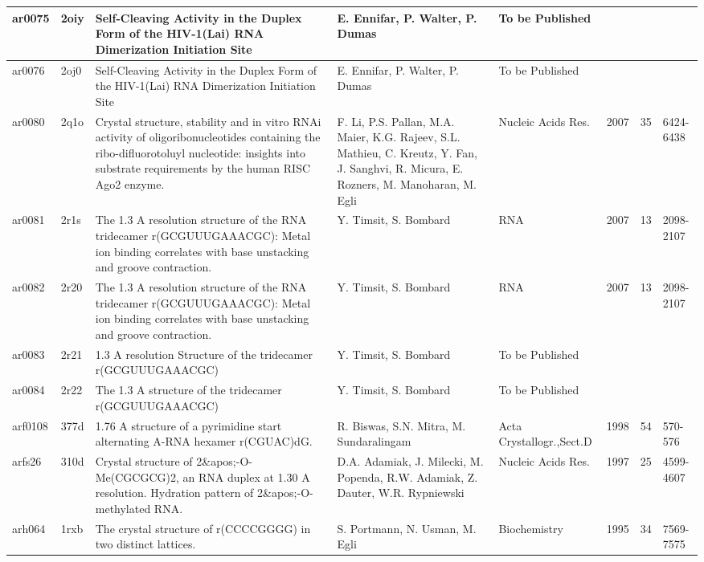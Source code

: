 {\begin{landscape}
\begin{center}
\begin{longtable}{p{0.76cm}   p{0.74cm}  p{5.2cm}   p{5.2cm}  p{3.2cm}
    p{0.6cm} p{0.9cm} p{1.8cm}}
ar0075 & 2oiy & Self-Cleaving Activity in the Duplex Form of the HIV-1(Lai) RNA Dimerization Initiation Site & E. Ennifar, P. Walter, P. Dumas & To be Published & \multicolumn{1}{l}{} & \multicolumn{1}{l}{} &   \\ \hline
ar0076 & 2oj0 & Self-Cleaving Activity in the Duplex Form of the HIV-1(Lai) RNA Dimerization Initiation Site & E. Ennifar, P. Walter, P. Dumas & To be Published & \multicolumn{1}{l}{} & \multicolumn{1}{l}{} &   \\ \hline
ar0080 & 2q1o & Crystal structure, stability and in vitro RNAi activity of oligoribonucleotides containing the ribo-difluorotoluyl nucleotide: insights into substrate requirements by the human RISC Ago2 enzyme. & F. Li, P.S. Pallan, M.A. Maier, K.G. Rajeev, S.L. Mathieu, C. Kreutz, Y. Fan, J. Sanghvi, R. Micura, E. Rozners, M. Manoharan, M. Egli & Nucleic Acids Res. & 2007 & 35 & 6424-6438 \\ \hline
ar0081 & 2r1s & The 1.3 A resolution structure of the RNA tridecamer r(GCGUUUGAAACGC): Metal ion binding correlates with base unstacking and groove contraction. & Y. Timsit, S. Bombard & RNA & 2007 & 13 & 2098-2107 \\ \hline
ar0082 & 2r20 & The 1.3 A resolution structure of the RNA tridecamer r(GCGUUUGAAACGC): Metal ion binding correlates with base unstacking and groove contraction. & Y. Timsit, S. Bombard & RNA & 2007 & 13 & 2098-2107 \\ \hline
ar0083 & 2r21 & 1.3 A resolution Structure of the tridecamer r(GCGUUUGAAACGC) & Y. Timsit, S. Bombard & To be Published & \multicolumn{1}{l}{} & \multicolumn{1}{l}{} &   \\ \hline
ar0084 & 2r22 & The 1.3 A structure of the tridecamer r(GCGUUUGAAACGC) & Y. Timsit, S. Bombard & To be Published & \multicolumn{1}{l}{} & \multicolumn{1}{l}{} &   \\ \hline
arf0108 & 377d & 1.76 A structure of a pyrimidine start alternating A-RNA hexamer r(CGUAC)dG. & R. Biswas, S.N. Mitra, M. Sundaralingam & Acta Crystallogr.,Sect.D & 1998 & 54 & 570-576 \\ \hline
arfs26 & 310d & Crystal structure of 2\&apos;-O-Me(CGCGCG)2, an RNA duplex at 1.30 A resolution. Hydration pattern of 2\&apos;-O-methylated RNA. & D.A. Adamiak, J. Milecki, M. Popenda, R.W. Adamiak, Z. Dauter, W.R. Rypniewski & Nucleic Acids Res. & 1997 & 25 & 4599-4607 \\ \hline
arh064 & 1rxb & The crystal structure of r(CCCCGGGG) in two distinct lattices. & S. Portmann, N. Usman, M. Egli & Biochemistry & 1995 & 34 & 7569-7575 \\ \hline

\end{longtable}
\end{center}
\end{landscape}}
